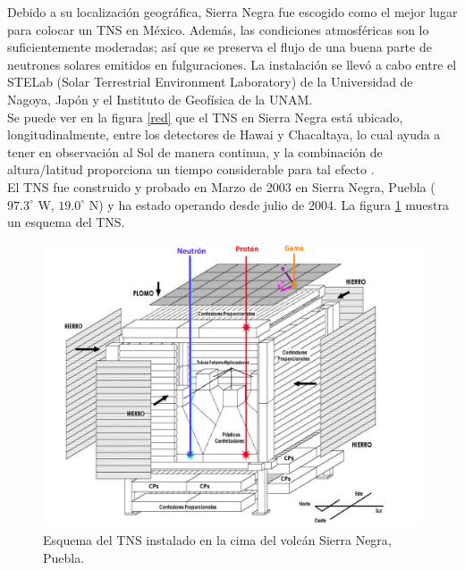 Debido a su localización geográfica, Sierra Negra fue escogido como el mejor lugar para colocar un TNS en México. Además, las condiciones atmosféricas son lo suficientemente moderadas; así que se preserva el flujo de una buena parte de neutrones solares emitidos en fulguraciones. La instalación se llevó a cabo entre el STELab (Solar Terrestrial Environment Laboratory) de la Universidad de Nagoya, Japón y el Instituto de Geofísica de la UNAM.\\

Se puede ver en la figura \ref{red} que el TNS en Sierra Negra está ubicado, longitudinalmente, entre los detectores de Hawai y Chacaltaya, lo cual ayuda a tener en observación al Sol de manera continua, y la combinación de altura/latitud proporciona un tiempo considerable para tal efecto .\\

El TNS fue construido y probado en Marzo de 2003 en Sierra Negra, Puebla ($97.3^{\circ}$ W, $19.0^{\circ}$ N) y ha estado operando desde julio de 2004\cite{geo}. La figura \ref{tns} muestra un esquema del TNS.\\
 
 \begin{figure}[H]
  \centering
    \includegraphics[scale=0.60]{Capitulo2/figs/EsTNS.pdf}      %
  \caption{Esquema del TNS instalado en la cima del volcán Sierra Negra, Puebla.}            %
  \label{tns}                            %
\end{figure}

